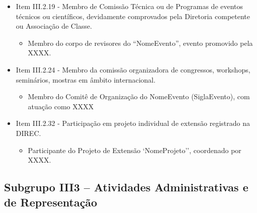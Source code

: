 \begin{itemize}
    \item Item III.2.19 - Membro de Comissão Técnica ou de Programas de eventos técnicos ou científicos, devidamente comprovados pela Diretoria competente ou Associação de Classe.
    \begin{itemize}
        \item Membro do corpo de revisores do ``NomeEvento'', evento promovido pela XXXX.
    \end{itemize}

    \item Item III.2.24 - Membro da comissão organizadora de congressos, workshops, seminários, mostras em âmbito internacional.
    \begin{itemize}
        \item Membro do Comitê de Organização do NomeEvento (SiglaEvento), com atuação como XXXX
    \end{itemize}

    \item Item III.2.32 - Participação em projeto individual de extensão registrado na DIREC.
    \begin{itemize}
        \item Participante do Projeto de Extensão `NomeProjeto'', coordenado por XXXX.
    \end{itemize}
\end{itemize}


\subsection{Subgrupo III3 -- Atividades Administrativas e de Representação}

